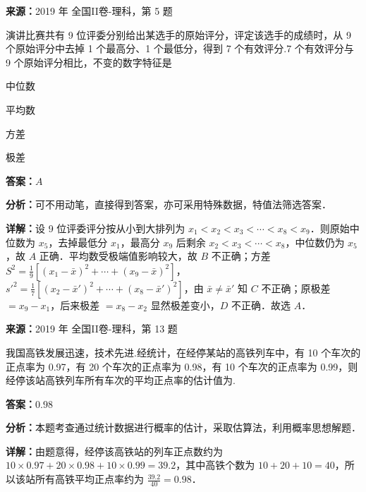 \begin{question}[points=5]
\textbf{来源：}2019 年 全国II卷-理科，第 5 题\par
演讲比赛共有 9 位评委分别给出某选手的原始评分，评定该选手的成绩时，从 9 个原始评分中去掉 1 个最高分、1 个最低分，得到 7 个有效评分.7 个有效评分与 9 个原始评分相比，不变的数字特征是
\begin{choices}
  \item 中位数
  \item 平均数
  \item 方差
  \item 极差
\end{choices}
\begin{solution}
\textbf{答案：}$A$

\textbf{分析：}可不用动笔，直接得到答案，亦可采用特殊数据，特值法筛选答案．

\textbf{详解：}设 9 位评委评分按从小到大排列为 $x_1<x_2<x_3<\cdots<x_8<x_9$．则原始中位数为 $x_5$，去掉最低分 $x_1$，最高分 $x_9$ 后剩余 $x_2<x_3<\cdots<x_8$，中位数仍为 $x_5$，故 $A$ 正确．平均数受极端值影响较大，故 $B$ 不正确；方差 $S^2=\frac{1}{9}[(x_1-\bar{x})^2+\cdots+(x_9-\bar{x})^2]$，$s'^2=\frac{1}{7}[(x_2-\bar{x}')^2+\cdots+(x_8-\bar{x}')^2]$，由 $\bar{x}\neq\bar{x}'$ 知 $C$ 不正确；原极差 $=x_9-x_1$，后来极差 $=x_8-x_2$ 显然极差变小，$D$ 不正确．故选 $A$．
\end{solution}
\end{question}

\begin{question}[points=5]
\textbf{来源：}2019 年 全国II卷-理科，第 13 题\par
我国高铁发展迅速，技术先进.经统计，在经停某站的高铁列车中，有 10 个车次的正点率为 0.97，有 20 个车次的正点率为 0.98，有 10 个车次的正点率为 0.99，则经停该站高铁列车所有车次的平均正点率的估计值为.
\fillin[{$0.98$}]
\begin{solution}
\textbf{答案：}$0.98$

\textbf{分析：}本题考查通过统计数据进行概率的估计，采取估算法，利用概率思想解题．

\textbf{详解：}由题意得，经停该高铁站的列车正点数约为 $10\times0.97+20\times0.98+10\times0.99=39.2$，其中高铁个数为 $10+20+10=40$，所以该站所有高铁平均正点率约为 $\frac{39.2}{40}=0.98$．
\end{solution}
\end{question}

